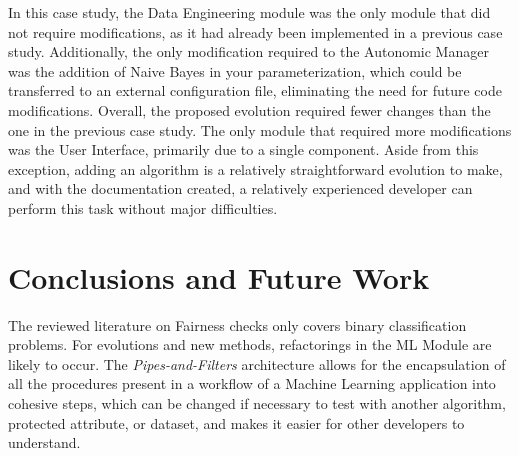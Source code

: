 \documentclass[sigconf]{acmart}
\begin{document}
\begin{table}[H]
\begin{center}
  \caption{Number of modifications performed when adding a new algorithm to ML Module}
\label{tbl:ManutencaoPipelineCaso3}
\end{center}
\end{table}

In this case study, the Data Engineering module was the only module that did not require modifications, as it had already been implemented in a previous case study. Additionally, the only modification required to the Autonomic Manager was the addition of Naive Bayes in your parameterization, which could be transferred to an external configuration file, eliminating the need for future code modifications. Overall, the proposed evolution required fewer changes than the one in the previous case study. The only module that required more modifications was the User Interface, primarily due to a single component. Aside from this exception, adding an algorithm is a relatively straightforward evolution to make, and with the documentation created, a relatively experienced developer can perform this task without major difficulties.

\section{Conclusions and Future Work}

The reviewed literature on Fairness checks only covers binary classification problems. For evolutions and new methods, refactorings in the ML Module are likely to occur. The \textit{Pipes-and-Filters} architecture allows for the encapsulation of all the procedures present in a workflow of a Machine Learning application into cohesive steps, which can be changed if necessary to test with another algorithm, protected attribute, or dataset, and makes it easier for other developers to understand.
\end{document}
